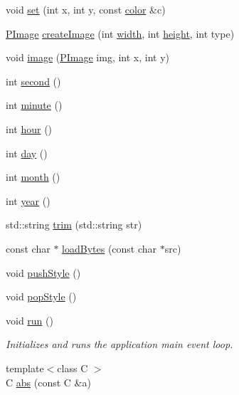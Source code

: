\begin{DoxyCompactItemize}
void \hyperlink{namespacecprocessing_ab9901a77b5bce93f75353a9d43183b2c}{set} (int x, int y, const \hyperlink{classcprocessing_1_1color}{color} \&c)
\item 
\hyperlink{classcprocessing_1_1PImage}{\-P\-Image} \hyperlink{namespacecprocessing_a5e491b64f5f6c2485d3383035138c15b}{create\-Image} (int \hyperlink{namespacecprocessing_a7af937eb8772235def57fcadd10fc82a}{width}, int \hyperlink{namespacecprocessing_ac392753eef02e2ad4ad84f5a076919be}{height}, int type)
\item 
void \hyperlink{namespacecprocessing_a9aa099fb5778d1a4bae8fae7f98abad0}{image} (\hyperlink{classcprocessing_1_1PImage}{\-P\-Image} img, int x, int y)
\item 
int \hyperlink{namespacecprocessing_a66f0b80b6d8a63fcea448fda228a3bef}{second} ()
\item 
int \hyperlink{namespacecprocessing_a9382ebc0ea6d75f30a10c76e250363d3}{minute} ()
\item 
int \hyperlink{namespacecprocessing_a7cb939c2601830024528a43714e200dc}{hour} ()
\item 
int \hyperlink{namespacecprocessing_a23894b5b22c13abcae989418ba4b7043}{day} ()
\item 
int \hyperlink{namespacecprocessing_aecf7ffcc2511c4dd27779f25c1d5d0c9}{month} ()
\item 
int \hyperlink{namespacecprocessing_a37a2ca5a2132ec009826dc5d02c2bd0c}{year} ()
\item 
std\-::string \hyperlink{namespacecprocessing_a22f7836c5ee2ece827cb87f532b69bea}{trim} (std\-::string str)
\item 
const char $\ast$ \hyperlink{namespacecprocessing_a4874f805f42f926ed40ef576dac51201}{load\-Bytes} (const char $\ast$src)
\item 
void \hyperlink{namespacecprocessing_a7d4e83016b65fe24a4c5258de029d090}{push\-Style} ()
\item 
void \hyperlink{namespacecprocessing_a6a4b0f1cede3b31e1da5bfbb4812b479}{pop\-Style} ()
\item 
void \hyperlink{namespacecprocessing_ab37eb8944511fff015ea51aa57755bad}{run} ()
\begin{DoxyCompactList}\small\item\em \-Initializes and runs the application main event loop. \end{DoxyCompactList}\item 
{\footnotesize template$<$class C $>$ }\\\-C \hyperlink{namespacecprocessing_a240a51ca039c8fbd359e2fb8c2d583d9}{abs} (const \-C \&a)

\end{DoxyCompactItemize}
